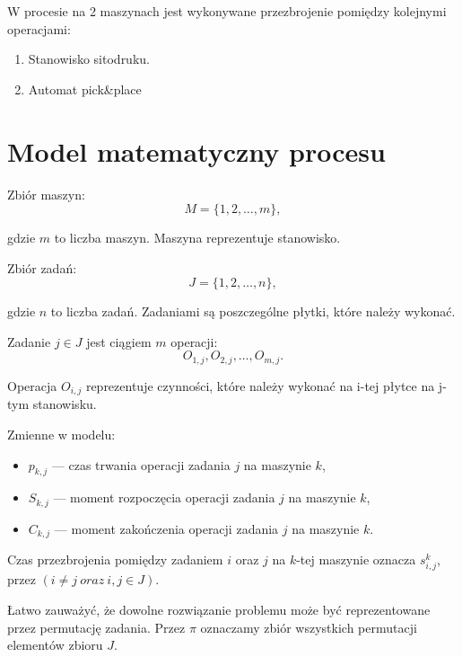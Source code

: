 \newpage{}
W procesie na 2 maszynach jest wykonywane przezbrojenie pomiędzy kolejnymi operacjami:
\begin{enumerate}
	\item Stanowisko sitodruku.
	\item Automat pick\&place
\end{enumerate}

\section{Model matematyczny procesu}

\breakparagraph{}
Zbiór maszyn:
\begin{equation}
	M=\lbrace 1, 2, \dots, m \rbrace,
\end{equation}

gdzie $m$ to liczba maszyn. Maszyna reprezentuje stanowisko.

\breakparagraph{}
Zbiór zadań:
\begin{equation}
	J=\lbrace 1, 2, \dots, n \rbrace,
\end{equation}

gdzie $n$ to liczba zadań. Zadaniami są poszczególne płytki, które należy wykonać.

\breakparagraph{}
Zadanie $j \in J$ jest ciągiem $m$ operacji:
\begin{equation}
	O_{1, j}, O_{2, j}, \dots, O_{m, j}.
\end{equation}

Operacja $O_{i, j}$ reprezentuje czynności, które należy wykonać na i-tej płytce na j-tym stanowisku.

\breakparagraph{}
Zmienne w modelu:
\begin{itemize}
	\item $p_{k, j}$ --- czas trwania operacji zadania $j$ na maszynie $k$,
	\item $S_{k, j}$ --- moment rozpoczęcia operacji zadania $j$ na maszynie $k$,
	\item $C_{k, j}$ --- moment zakończenia operacji zadania $j$ na maszynie $k$.
\end{itemize}

\breakparagraph{}
Czas przezbrojenia pomiędzy zadaniem $i$ oraz $j$ na $k$-tej maszynie oznacza $s_{i, j}^{k}$, przez $( i \neq j \ oraz\ i, j \in J )$.

\breakparagraph{}
Łatwo zauważyć, że dowolne rozwiązanie problemu może być reprezentowane przez permutację zadania. Przez $\pi$ oznaczamy zbiór wszystkich permutacji elementów zbioru $J$.

